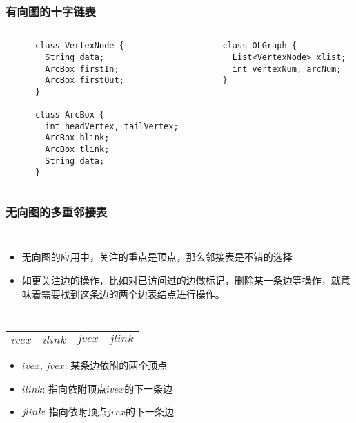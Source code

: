 \begin{frame}[fragile]
  \frametitle{有向图的十字链表}
  \begin{columns}
    \begin{verbatim}
      class VertexNode {
        String data;
        ArcBox firstIn;
        ArcBox firstOut;
      }

      class ArcBox {
        int headVertex, tailVertex;
        ArcBox hlink;
        ArcBox tlink;
        String data;
      }
    \end{verbatim}
    \begin{verbatim}
      class OLGraph {
        List<VertexNode> xlist;
        int vertexNum, arcNum;
      }
    \end{verbatim}
  \end{columns}
\end{frame}

\begin{frame}[fragile]
  \frametitle{无向图的多重邻接表}
  \begin{columns}[T]

    \small
    \begin{itemize}
    \item 无向图的应用中，关注的重点是顶点，那么邻接表是不错的选择
    \item 如更关注边的操作，比如对已访问过的边做标记，删除某一条边等操作，就意味着需要找到这条边的两个边表结点进行操作。
    \end{itemize}
  \end{columns}

  \begin{tabular}{|c|c|c|c}
    \hline
    $ivex$ & $ilink$ & $jvex$ & $jlink$ \\ \hline
  \end{tabular}
  
  \begin{itemize}
  \item $ivex$, $jvex$: 某条边依附的两个顶点
  \item $ilink$: 指向依附顶点$ivex$的下一条边
  \item $jlink$: 指向依附顶点$jvex$的下一条边
  \end{itemize}
\end{frame}

